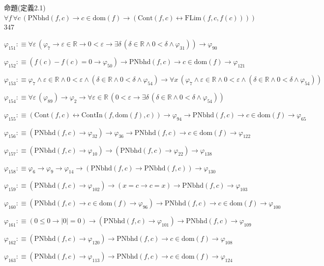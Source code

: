 \begin{fullproof}{命題(定義2.1)}{$\forall f\,\forall c\,(\mathrm{PNbhd}(f,c) \to c \in \mathrm{dom}(f) \to (\mathrm{Cont}(f,c) \leftrightarrow \mathrm{FLim}(f,c,f(c))))$}{347}
\begin{abbrevlist}
\item $\varphi_{151} :\equiv \forall \varepsilon\,(\varphi_{7} \to \varepsilon \in \mathbb{R} \to 0 < \varepsilon \to \exists \delta\,(\delta \in \mathbb{R} \land 0 < \delta \land \varphi_{31})) \to \varphi_{90}$
\item $\varphi_{152} :\equiv (f(c) - f(c) = 0 \to \varphi_{50}) \to \mathrm{PNbhd}(f,c) \to c \in \mathrm{dom}(f) \to \varphi_{121}$
\item $\varphi_{153} :\equiv \varphi_{7} \land \varepsilon \in \mathbb{R} \land 0 < \varepsilon \land (\delta \in \mathbb{R} \land 0 < \delta \land \varphi_{54}) \to \forall x\,(\varphi_{7} \land \varepsilon \in \mathbb{R} \land 0 < \varepsilon \land (\delta \in \mathbb{R} \land 0 < \delta \land \varphi_{54}))$
\item $\varphi_{154} :\equiv \forall \varepsilon\,(\varphi_{89}) \to \varphi_{2} \to \forall \varepsilon \in \mathbb{R}\,(0 < \varepsilon \to \exists \delta\,(\delta \in \mathbb{R} \land 0 < \delta \land \varphi_{54}))$
\item $\varphi_{155} :\equiv (\mathrm{Cont}(f,c) \leftrightarrow \mathrm{ContIn}(f,\mathrm{dom}(f),c)) \to \varphi_{94} \to \mathrm{PNbhd}(f,c) \to c \in \mathrm{dom}(f) \to \varphi_{65}$
\item $\varphi_{156} :\equiv (\mathrm{PNbhd}(f,c) \to \varphi_{32}) \to \varphi_{36} \to \mathrm{PNbhd}(f,c) \to c \in \mathrm{dom}(f) \to \varphi_{122}$
\item $\varphi_{157} :\equiv (\mathrm{PNbhd}(f,c) \to \varphi_{10}) \to (\mathrm{PNbhd}(f,c) \to \varphi_{22}) \to \varphi_{138}$
\item $\varphi_{158} :\equiv \varphi_{6} \to \varphi_{9} \to \varphi_{14} \to (\mathrm{PNbhd}(f,c) \to \mathrm{PNbhd}(f,c)) \to \varphi_{130}$
\item $\varphi_{159} :\equiv (\mathrm{PNbhd}(f,c) \to \varphi_{102}) \to (x = c \to c = x) \to \mathrm{PNbhd}(f,c) \to \varphi_{103}$
\item $\varphi_{160} :\equiv (\mathrm{PNbhd}(f,c) \to c \in \mathrm{dom}(f) \to \varphi_{96}) \to \mathrm{PNbhd}(f,c) \to c \in \mathrm{dom}(f) \to \varphi_{100}$
\item $\varphi_{161} :\equiv (0 \leq 0 \to \lvert 0 \rvert = 0) \to (\mathrm{PNbhd}(f,c) \to \varphi_{101}) \to \mathrm{PNbhd}(f,c) \to \varphi_{109}$
\item $\varphi_{162} :\equiv (\mathrm{PNbhd}(f,c) \to \varphi_{120}) \to \mathrm{PNbhd}(f,c) \to c \in \mathrm{dom}(f) \to \varphi_{108}$
\item $\varphi_{163} :\equiv (\mathrm{PNbhd}(f,c) \to \varphi_{113}) \to \mathrm{PNbhd}(f,c) \to c \in \mathrm{dom}(f) \to \varphi_{124}$

\end{abbrevlist}
\end{fullproof}
